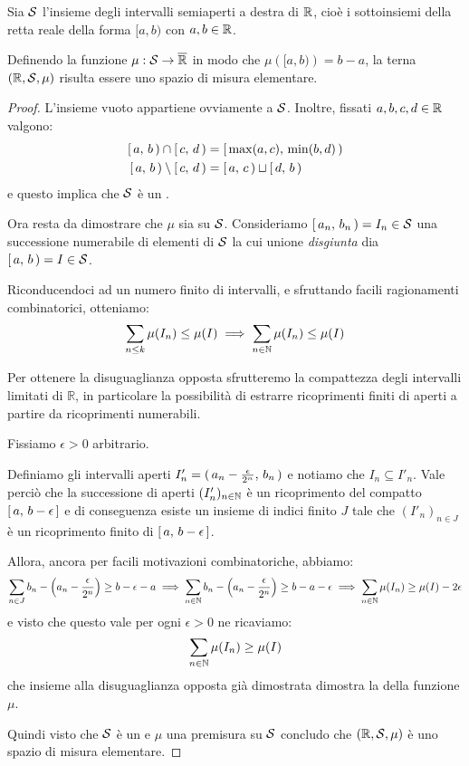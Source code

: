 \begin{theorem}\label{LebesguePremisura}
	Sia $\S$ l'insieme degli intervalli semiaperti a destra di $\R$, cioè i sottoinsiemi della retta reale della forma $[a,b)$ con $a,b\in\R$.
	
	Definendo la funzione $\mu:\S\to\Rbar$ in modo che $\mu\left([a,b)\right)=b-a$, la terna $(\R,\S,\mu)$ risulta essere uno spazio di misura elementare.
\end{theorem}
\begin{proof}
	L'insieme vuoto appartiene ovviamente a $\S$.
	Inoltre, fissati $a,b,c,d\in\R$ valgono:
	\begin{align*}
		\so ab\cap \so cd &= \so {\max(a,c)}{\min(b,d)}\\
		\so ab\setminus \so cd&= \so ac\sqcup \so db
	\end{align*}
	e questo implica che $\S$ è un \semiring{}.
	
	Ora resta da dimostrare che $\mu$ sia \sigadd{} su $\S$.
	Consideriamo $\so {a_n}{b_n}=I_n\in \S$ una successione numerabile di elementi di $\S$ la cui unione \emph{disgiunta} dia $\so ab=I\in \S$.
	
	Riconducendoci ad un numero finito di intervalli, e sfruttando facili ragionamenti combinatorici, otteniamo:
	\begin{equation*}
		\sum_{n\le k} \mu(I_n)\le \mu(I) \implies \sum_{n\in\N}\mu(I_n)\le \mu(I)
	\end{equation*}
	
	Per ottenere la disuguaglianza opposta sfrutteremo la compattezza degli intervalli limitati di $\mathbb R$, in particolare la possibilità di estrarre ricoprimenti finiti di aperti a partire da ricoprimenti numerabili.
	
	Fissiamo $\epsilon>0$ arbitrario.
	
	Definiamo gli intervalli aperti $I'_n=\oo{a_n-\frac\epsilon{2^n}}{b_n}$ e notiamo che $I_n\subseteq I'_n$.
	Vale perciò che la successione di aperti $(I'_n)_{n\in\N}$ è un ricoprimento del compatto $\cc a{b-\epsilon}$ e di conseguenza esiste un insieme di indici finito $J$ tale che $(I'_n)_{n\in J}$ è un ricoprimento finito di $\cc a{b-\epsilon}$.
	
	Allora, ancora per facili motivazioni combinatoriche, abbiamo:
	\begin{equation*}
		\sum_{n\in J} b_n-\left(a_n-\frac\epsilon{2^n}\right)\ge b-\epsilon-a\implies
		\sum_{n\in\N} b_n-\left(a_n-\frac\epsilon{2^n}\right)\ge b-a-\epsilon \implies
		\sum_{n\in\N} \mu(I_n)\ge \mu(I)-2\epsilon
	\end{equation*}
	e visto che questo vale per ogni $\epsilon>0$ ne ricaviamo:
	\begin{equation*}
		\sum_{n\in\N}\mu(I_n)\ge \mu(I)
	\end{equation*}
	che insieme alla disuguaglianza opposta già dimostrata dimostra la \sigadd[ità] della funzione $\mu$.
	
	Quindi visto che $\S$ è un \semiring{} e $\mu$ una premisura su $\S$ concludo che $(\R,\S,\mu)$ è uno spazio di misura elementare.
\end{proof}

